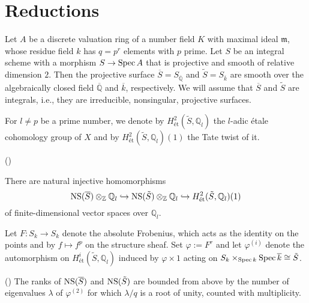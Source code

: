 \documentclass[main]{subfiles}
\begin{document}
\chapter{Reductions}
\label{chap:reduction}

Let $A$ be a discrete valuation ring of a number field $K$ with maximal ideal $\mathfrak{m}$, whose residue field $k$ has $q=p^r$ elements with $p$ prime.
Let $S$ be an integral scheme with a morphism $S \to \operatorname{Spec} A$ that is projective and smooth of relative dimension $2$.
Then the projective surface $\overline{S}=S_{\overline{\mathbb{Q}}}$ and $\tilde{S}=S_{\overline{k}}$ are smooth over the algebraically closed field $\overline{\mathbb{Q}}$ and $\overline{k}$, respectively.
We will assume that $\overline{S}$ and $\tilde{S}$ are integrals, i.e., they are irreducible, nonsingular, projective surfaces.

For $l \neq p$ be a prime number, we denote by $H_{\text{\'et}}^{2}(\tilde{S}, \mathbb{Q}_l)$ the $l$-adic \'etale cohomology group of $X$ and by $H_{\text{\'et}}^{2}(\tilde{S}, \mathbb{Q}_l)(1)$ the Tate twist of it.

\begin{thm}{(\cite[Proposition 6.2.]{ref:vanluijk2007})}

    There are natural injective homomorphisms
    \begin{equation}
        \operatorname{NS} (\overline{S}) \otimes_{\mathbb{Z}} \mathbb{Q}_{l} \hookrightarrow \operatorname{NS} (\tilde{S}) \otimes_{\mathbb{Z}} \mathbb{Q}_{l} \hookrightarrow H_{\text{\'et}}^{2}(\tilde{S}, \mathbb{Q}_{l})(1)
    \end{equation}
    of finite-dimensional vector spaces over $\mathbb{Q}_l$.
\end{thm}

Let $F: S_k \to S_k$ denote the absolute Frobenius, which acts as the identity on the points and by $f \mapsto f^p$ on the structure sheaf.
Set $\varphi:=F^{r}$ and let $\varphi^{(i)}$ denote the automorphism on $H_{\text{\'et}}^{i}(\tilde{S}, \mathbb{Q}_l)$ induced by $\varphi \times 1$ acting on $S_k \times_{\operatorname{Spec} k} \operatorname{Spec} \overline{k} \cong \tilde{S}$.

\begin{cor}{(\cite[Corollary 6.4.]{ref:vanluijk2007})}
    \label{cor:ns_upper_bound}
    The ranks of $\operatorname{NS} (\overline{S})$ and $\operatorname{NS} (\tilde{S})$ are bounded from above by the number of eigenvalues $\lambda$ of $\varphi^{(2)}$ for which $\lambda/q$ is a root of unity, counted with multiplicity.
\end{cor}
\end{document}
